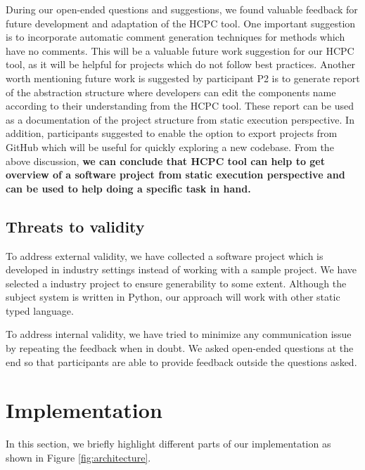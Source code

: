 During our open-ended questions and suggestions, we found valuable feedback for future development and adaptation of the HCPC tool. One important suggestion is to incorporate automatic comment generation techniques for methods which have no comments. This will be a valuable future work suggestion for our HCPC tool, as it will be helpful for projects which do not follow best practices. Another worth mentioning future work is suggested by participant P2 is to generate report of the abstraction structure where developers can edit the components name according to their understanding from the HCPC tool. These report can be used as a documentation of the project structure from static execution perspective. In addition, participants suggested to enable the option to export projects from GitHub which will be useful for quickly exploring a new codebase. From the above discussion, \textbf{we can conclude that HCPC tool can help to get overview of a software project from static execution perspective and can be used to help doing a specific task in hand.}




\subsection{Threats to validity}
To address external validity, we have collected a software project which is developed in industry settings instead of working with a sample project. We have selected a industry project to ensure generability to some extent. Although the subject system is written in Python, our approach will work with other static typed language.

To address internal validity, we have tried to minimize any communication issue by repeating the feedback when in doubt. We asked open-ended questions at the end so that participants are able to provide feedback outside the questions asked. 


\section{Implementation }
In this section, we briefly highlight different parts of our implementation as shown in Figure \ref{fig:architecture}.

